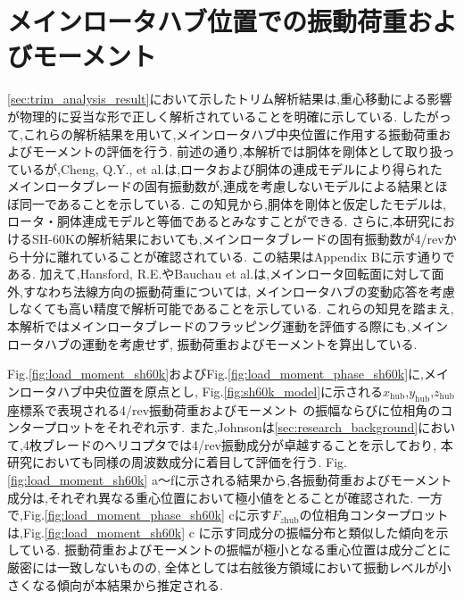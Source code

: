     \section{メインロータハブ位置での振動荷重およびモーメント}
    \label{sec:FandM_sh60k}
    \par  
    \ref{sec:trim_analysis_result}において示したトリム解析結果は,重心移動による影響が物理的に妥当な形で正しく解析されていることを明確に示している.
    したがって,これらの解析結果を用いて,メインロータハブ中央位置に作用する振動荷重およびモーメントの評価を行う.
    前述の通り,本解析では胴体を剛体として取り扱っているが,Cheng, Q.Y., et al.は,ロータおよび胴体の連成モデルにより得られた
    メインロータブレードの固有振動数が,連成を考慮しないモデルによる結果とほぼ同一であることを示している.
    この知見から,胴体を剛体と仮定したモデルは,ロータ・胴体連成モデルと等価であるとみなすことができる.
    さらに,本研究におけるSH-60Kの解析結果においても,メインロータブレードの固有振動数が4/revから十分に離れていることが確認されている.
    この結果はAppendix Bに示す通りである.
    加えて,Hansford, R.E.やBauchau et al.は,メインロータ回転面に対して面外,すなわち法線方向の振動荷重については,
    メインロータハブの変動応答を考慮しなくても高い精度で解析可能であることを示している.
    これらの知見を踏まえ,本解析ではメインロータブレードのフラッピング運動を評価する際にも,メインロータハブの運動を考慮せず,
    振動荷重およびモーメントを算出している.

    \par
    Fig.\ref{fig:load_moment_sh60k}およびFig.\ref{fig:load_moment_phase_sh60k}に,メインロータハブ中央位置を原点とし,
    Fig.\ref{fig:sh60k_model}に示される$x_{\mathrm{hub}}$,$y_{\mathrm{hub}}$,$z_{\mathrm{hub}}$座標系で表現される4/rev振動荷重およびモーメント
    の振幅ならびに位相角のコンタープロットをそれぞれ示す.
    また,Johnsonは\ref{sec:research_background}において,4枚ブレードのヘリコプタでは4/rev振動成分が卓越することを示しており,
    本研究においても同様の周波数成分に着目して評価を行う.
    Fig.\ref{fig:load_moment_sh60k} a～fに示される結果から,各振動荷重およびモーメント成分は,それぞれ異なる重心位置において極小値をとることが確認された.
    一方で,Fig.\ref{fig:load_moment_phase_sh60k} cに示す$F_{z\mathrm{hub}}$の位相角コンタープロットは,Fig.\ref{fig:load_moment_sh60k} c
    に示す同成分の振幅分布と類似した傾向を示している.
    振動荷重およびモーメントの振幅が極小となる重心位置は成分ごとに厳密には一致しないものの,
    全体としては右舷後方領域において振動レベルが小さくなる傾向が本結果から推定される.

